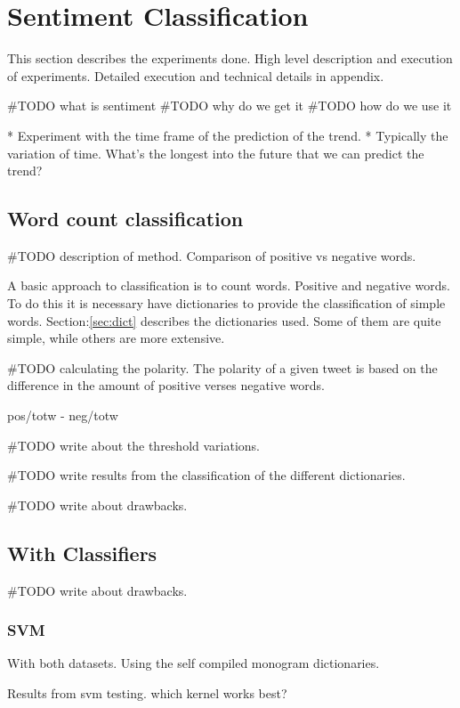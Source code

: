 
\chapter{Sentiment Classification}
This section describes the experiments done. High level description and
execution of experiments. Detailed execution and technical details in appendix. 

#TODO what is sentiment
#TODO why do we get it
#TODO how do we use it 


* Experiment with the time frame of the prediction of the trend. 
	* Typically the variation of time. What's the longest into the future that
we can predict the trend?

\section{Word count classification}
#TODO description of method. 
Comparison of positive vs negative words.

A basic approach to classification is to count words. Positive and negative
words. To do this it is necessary have dictionaries to provide the
classification of simple words. Section:\ref{sec:dict} describes the
dictionaries used. Some of them are quite simple, while others are more
extensive. 

#TODO calculating the polarity.  
The polarity of a given tweet is based on the difference in the amount of
positive verses negative words.

pos/totw - neg/totw 

#TODO write about the threshold variations.  

#TODO write results from the classification of the different dictionaries.

#TODO write about drawbacks. 

\section{With Classifiers}

#TODO write about drawbacks. 

\subsection{SVM}
With both datasets.
Using the self compiled monogram dictionaries. 

Results from svm testing. which kernel works best?

